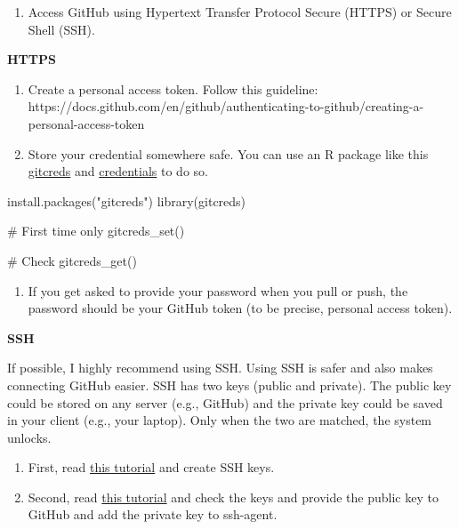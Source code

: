 \documentclass[
  letterpaper,
  DIV=11,
  numbers=noendperiod]{scrreprt}
\newenvironment{Shaded}{\begin{snugshade}}{\end{snugshade}}
\newcommand{\CommentTok}[1]{\textcolor[rgb]{0.37,0.37,0.37}{#1}}
\newcommand{\FunctionTok}[1]{\textcolor[rgb]{0.28,0.35,0.67}{#1}}
\newcommand{\NormalTok}[1]{\textcolor[rgb]{0.00,0.23,0.31}{#1}}
\newcommand{\StringTok}[1]{\textcolor[rgb]{0.13,0.47,0.30}{#1}}
\providecommand{\tightlist}{%
  \setlength{\itemsep}{0pt}\setlength{\parskip}{0pt}}\usepackage{longtable,booktabs,array}
\begin{document}
\begin{enumerate}
\def\labelenumi{\arabic{enumi}.}
\setcounter{enumi}{2}
\tightlist
\item
  Access GitHub using Hypertext Transfer Protocol Secure (HTTPS) or
  Secure Shell (SSH).
\end{enumerate}

\textbf{HTTPS}

\begin{enumerate}
\def\labelenumi{\arabic{enumi}.}
\item
  Create a personal access token. Follow this guideline:
  https://docs.github.com/en/github/authenticating-to-github/creating-a-personal-access-token
\item
  Store your credential somewhere safe. You can use an R package like
  this \href{https://gitcreds.r-lib.org/}{gitcreds} and
  \href{https://docs.ropensci.org/credentials/}{credentials} to do so.
\end{enumerate}

\begin{Shaded}
\begin{Highlighting}[]
\FunctionTok{install.packages}\NormalTok{(}\StringTok{"gitcreds"}\NormalTok{)}
\FunctionTok{library}\NormalTok{(gitcreds)}

\CommentTok{\# First time only }
\FunctionTok{gitcreds\_set}\NormalTok{()}

\CommentTok{\# Check }
\FunctionTok{gitcreds\_get}\NormalTok{()}
\end{Highlighting}
\end{Shaded}

\begin{enumerate}
\def\labelenumi{\arabic{enumi}.}
\setcounter{enumi}{2}
\tightlist
\item
  If you get asked to provide your password when you pull or push, the
  password should be your GitHub token (to be precise, personal access
  token).
\end{enumerate}

\textbf{SSH}

If possible, I highly recommend using SSH. Using SSH is safer and also
makes connecting GitHub easier. SSH has two keys (public and private).
The public key could be stored on any server (e.g., GitHub) and the
private key could be saved in your client (e.g., your laptop). Only when
the two are matched, the system unlocks.

\begin{enumerate}
\def\labelenumi{\arabic{enumi}.}
\item
  First, read
  \href{https://docs.github.com/en/github/authenticating-to-github/connecting-to-github-with-ssh}{this
  tutorial} and create SSH keys.
\item
  Second, read \href{https://happygitwithr.com/ssh-keys.html}{this
  tutorial} and check the keys and provide the public key to GitHub and
  add the private key to ssh-agent.
\end{enumerate}
\end{document}
